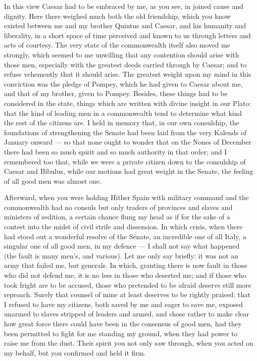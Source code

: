  In this view Caesar had to be embraced by me, as you see, in joined cause and dignity. Here there weighed much both the old friendship, which you know existed between me and my brother Quintus and Caesar, and his humanity and liberality, in a short space of time perceived and known to us through letters and acts of courtesy. The very state of the commonwealth itself also moved me strongly, which seemed to me unwilling that any contention should arise with those men, especially with the greatest deeds carried through by Caesar; and to refuse vehemently that it should arise. The greatest weight upon my mind in this conviction was the pledge of Pompey, which he had given to Caesar about me, and that of my brother, given to Pompey. Besides, these things had to be considered in the state, things which are written with divine insight in our Plato: that the kind of leading men in a commonwealth tend to determine what kind the rest of the citizens are. I held in memory that, in our own consulship, the foundations of strengthening the Senate had been laid from the very Kalends of January onward --- so that none ought to wonder that on the Nones of December there had been so much spirit and so much authority in that order; and I remembered too that, while we were a private citizen down to the consulship of Caesar and Bibulus, while our motions had great weight in the Senate, the feeling of all good men was almost one.

 Afterward, when you were holding Hither Spain with military command and the commonwealth had no consuls but only traders of provinces and slaves and ministers of sedition, a certain chance flung my head as if for the sake of a contest into the midst of civil strife and dissension. In which crisis, when there had stood out a wonderful resolve of the Senate, an incredible one of all Italy, a singular one of all good men, in my defence --- I shall not say what happened (the fault is many men's, and various). Let me only say briefly: it was not an army that failed me, but generals. In which, granting there is now fault in those who did not defend me, it is no less in those who deserted me; and if those who took fright are to be accused, those who pretended to be afraid deserve still more reproach. Surely that counsel of mine at least deserves to be rightly praised: that I refused to have my citizens, both saved by me and eager to save me, exposed unarmed to slaves stripped of leaders and armed, and chose rather to make clear how great force there could have been in the consensus of good men, had they been permitted to fight for me standing my ground, when they had power to raise me from the dust. Their spirit you not only saw through, when you acted on my behalf, but you confirmed and held it firm.


